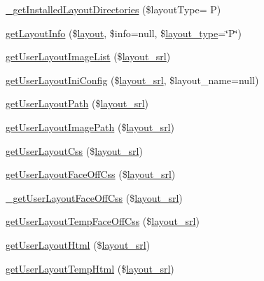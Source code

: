 \begin{DoxyCompactItemize}
\item 
\hyperlink{classlayoutModel_a4f50b5c829bf7c601a2938974a9a3b98}{\+\_\+get\+Installed\+Layout\+Directories} (\$layout\+Type= \textquotesingle{}P\textquotesingle{})
\item 
\hyperlink{classlayoutModel_a8f49f0b017ffa5fc1d12efd0dfab7c96}{get\+Layout\+Info} (\$\hyperlink{classlayout}{layout}, \$info=null, \$\hyperlink{ko_8install_8php_a0532d89570cfdaebc628afac2ff5a81b}{layout\+\_\+type}=\char`\"{}P\char`\"{})
\item 
\hyperlink{classlayoutModel_a6bb9dc3b7dc427d7916bf2a743b8e412}{get\+User\+Layout\+Image\+List} (\$\hyperlink{ko_8install_8php_a70054876db09b2519a1726663c8dd9e7}{layout\+\_\+srl})
\item 
\hyperlink{classlayoutModel_acf8661d658078547d762fb582f09e3b9}{get\+User\+Layout\+Ini\+Config} (\$\hyperlink{ko_8install_8php_a70054876db09b2519a1726663c8dd9e7}{layout\+\_\+srl}, \$layout\+\_\+name=null)
\item 
\hyperlink{classlayoutModel_ad852fe1c8eab29b23c998560031eabe4}{get\+User\+Layout\+Path} (\$\hyperlink{ko_8install_8php_a70054876db09b2519a1726663c8dd9e7}{layout\+\_\+srl})
\item 
\hyperlink{classlayoutModel_a8d7574bcc9329207e6cc1eb2da163288}{get\+User\+Layout\+Image\+Path} (\$\hyperlink{ko_8install_8php_a70054876db09b2519a1726663c8dd9e7}{layout\+\_\+srl})
\item 
\hyperlink{classlayoutModel_a1c4e0310f7fce01392ddae5eeb849a5c}{get\+User\+Layout\+Css} (\$\hyperlink{ko_8install_8php_a70054876db09b2519a1726663c8dd9e7}{layout\+\_\+srl})
\item 
\hyperlink{classlayoutModel_a82cac2109b93170e8f573576de2eb0d0}{get\+User\+Layout\+Face\+Off\+Css} (\$\hyperlink{ko_8install_8php_a70054876db09b2519a1726663c8dd9e7}{layout\+\_\+srl})
\item 
\hyperlink{classlayoutModel_ab8fbcb8e92739d001e4a010bc5c5cf3b}{\+\_\+get\+User\+Layout\+Face\+Off\+Css} (\$\hyperlink{ko_8install_8php_a70054876db09b2519a1726663c8dd9e7}{layout\+\_\+srl})
\item 
\hyperlink{classlayoutModel_aadc68d3ed9d3706536ff8d93d1aebd56}{get\+User\+Layout\+Temp\+Face\+Off\+Css} (\$\hyperlink{ko_8install_8php_a70054876db09b2519a1726663c8dd9e7}{layout\+\_\+srl})
\item 
\hyperlink{classlayoutModel_ae1d2250f4bb3703f82998937c46a0a57}{get\+User\+Layout\+Html} (\$\hyperlink{ko_8install_8php_a70054876db09b2519a1726663c8dd9e7}{layout\+\_\+srl})
\item 
\hyperlink{classlayoutModel_a19aaacba7d0b1c9bb466534933595381}{get\+User\+Layout\+Temp\+Html} (\$\hyperlink{ko_8install_8php_a70054876db09b2519a1726663c8dd9e7}{layout\+\_\+srl})

\end{DoxyCompactItemize}
